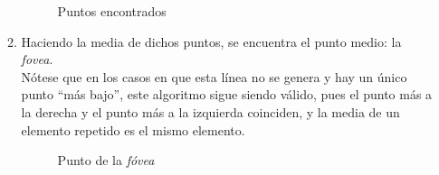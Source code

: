 \begin{enumerate}
\begin{enumerate}[label*=\arabic*.]
    \begin{figure}[H]
      \caption{Puntos encontrados}
      \centering \setlength\fboxsep{0pt} \setlength\fboxrule{0.5pt}
    \end{figure}

  \item Haciendo la media de dichos
    puntos, se encuentra el punto medio: la \emph{\gls{fovea}}. \\
    Nótese que en los casos en que esta línea no se genera y hay un
    único punto ``más bajo'', este algoritmo sigue siendo válido, pues
    el punto más a la derecha y el punto más a la izquierda coinciden,
    y la media de un elemento repetido es el mismo elemento.

    \begin{figure}[H]
      \caption{Punto de la \emph{fóvea}}
      \centering \setlength\fboxsep{0pt} \setlength\fboxrule{0.5pt}
    \end{figure}


\end{enumerate}
\end{enumerate}
